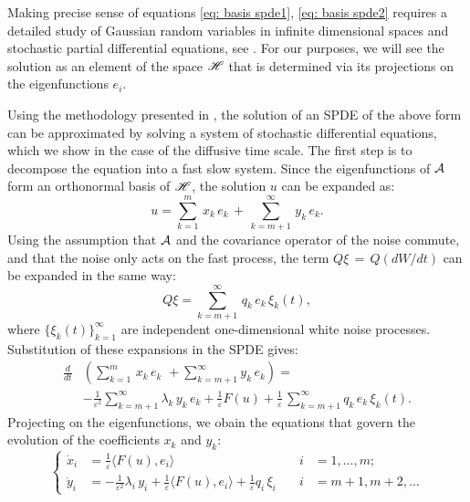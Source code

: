 Making precise sense of equations \eqref{eq: basis spde1}, \eqref{eq: basis spde2} requires a detailed study of Gaussian random variables in infinite dimensional spaces and stochastic partial differential equations, see \citep{da2008stochastic,hairer2009introduction}.
For our purposes, we will see the solution as an element of the space $\mathscr H$ that is determined via its projections on the eigenfunctions $e_i$. 

Using the methodology presented in \cite{abdulle2012numerical}, the solution of an SPDE of the above form can be approximated by solving a system of stochastic differential equations, which we show in the case of the diffusive time scale.
The first step is to decompose the equation into a fast slow system.
Since the eigenfunctions of $\mathcal A$ form an orthonormal basis of $\mathscr H$, the solution $u$ can be expanded as: 
\begin{equation*} 
    u = \sum_{k=1}^{m} \,x_{k}\,e_{k} \,+\,\sum_{k=m+1}^{\infty} \,y_{k}\,e_{k}.  
\end{equation*}
Using the assumption that $\mathcal A$ and the covariance operator of the noise commute, and that the noise only acts on the fast process, the term $Q{\xi}\,=\,Q (dW/dt)$ can be expanded in the same way: 
\begin{equation*} 
    Q{\xi}= \sum_{k=m+1}^{\infty}\,q_{k}\,e_{k}\,{\xi}_{k}(t),
\end{equation*} 
where $\{\xi_{k}(t) \}_{k=1}^{\infty}$ are independent one-dimensional white noise processes.
Substitution of these expansions in the SPDE gives: 
\begin{equation*}
    \begin{aligned} 
        \frac d{dt} & \left(\sum_{k=1}^{m}\,x_{k}\,e_{k}\,\,+\sum_{k=m+1}^{\infty}
            y_{k}\,e_{k} \right) = \\ & -\frac 1{\varepsilon^{2}}\sum_{k=m+1}^{\infty}
        \lambda_{k}\,y_{k}\,e_{k} + \frac 1 \varepsilon F(u) + \frac 1 \varepsilon\,
        \sum_{k=m+1}^{\infty}q_{k}\,e_{k}\,\xi_{k}(t).  
    \end{aligned} 
\end{equation*}
Projecting on the eigenfunctions, we obain the equations that govern the evolution of the coefficients $x_k$ and $y_k$:
\begin{equation*} 
    \left\{\begin{aligned}
            \dot x_{i} &= \frac 1 \varepsilon\langle F(u), e_{i}\rangle & \quad i & = 1,\dots,
            m;\\ \dot y_{i} &= -\frac 1 {\varepsilon^{2}} {\lambda}_{i}\,y_{i} + \frac 1\varepsilon\langle
            F(u), e_{i}\rangle +\frac 1\varepsilon q_{i}\,\xi_{i} & \quad i &= m+1,m+2, \dots
        \end{aligned} \right.  
\end{equation*} 
